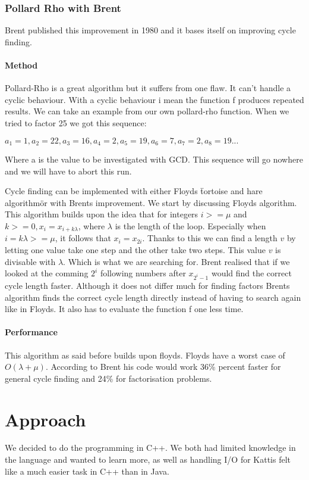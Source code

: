 \documentclass[a4paper, 12pt]{report}
\begin{document}
\subsection{Pollard Rho with Brent}
Brent published this improvement in 1980\cite{brentpdf} and it bases itself on improving cycle finding.
\subsubsection{Method}
Pollard-Rho is a great algorithm but it suffers from one flaw. It can't handle a cyclic behaviour. With a cyclic behaviour i mean the function f produces repeated results. We can take an example from our own pollard-rho function. When we tried to factor 25 we got this sequence:
\begin{center}
$a_1=1, a_2=22, a_3=16, a_4=2, a_5=19, a_6=7, a_7=2, a_8=19...$
\end{center}
Where a is the value to be investigated with GCD. This sequence will go nowhere and we will have to abort this run.

Cycle finding can be implemented with either Floyds \"tortoise and hare algorithm\" or with Brents improvement. We start by discussing Floyds algorithm. This algorithm builds upon the idea that for integers $i >= \mu$ and $k >= 0, x_i = x_{i + k\lambda}$, where $\lambda$ is the length of the loop. Especially when $i = k\lambda >= \mu$, it follows that $x_i = x_{2i}$. Thanks to this we can find a length $v$ by letting one value take one step and the other take two steps. This value $v$ is divisable with $\lambda$. Which is what we are searching for. Brent realised that if we looked at the comming $2^i$ following numbers after $x_{2^i-1}$ would find the correct cycle length faster. Although it does not differ much for finding factors Brents algorithm finds the correct cycle length directly instead of having to search again like in Floyds. It also has to evaluate the function f one less time.

\subsubsection{Performance}
This algorithm as said before builds upon floyds. Floyds have a worst case of $O(\lambda + \mu)$. According to Brent his code would work 36\% percent faster for general cycle finding and 24\% for factorisation problems.

\chapter{Approach}
We decided to do the programming in C++. We both had limited knowledge in the language and wanted to learn more, as well as handling I/O for Kattis felt like a much easier task in C++ than in Java. 
\end{document}
